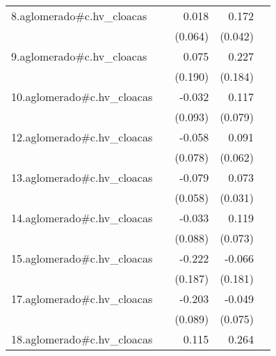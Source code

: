 {\begin{longtable}{l*{4}{D{.}{.}{-1}}}
\addlinespace
8.aglomerado#c.hv\_cloacas&                     &       0.018         &       0.172\sym{***}&                     \\
            &                     &     (0.064)         &     (0.042)         &                     \\
\addlinespace
9.aglomerado#c.hv\_cloacas&                     &       0.075         &       0.227         &                     \\
            &                     &     (0.190)         &     (0.184)         &                     \\
\addlinespace
10.aglomerado#c.hv\_cloacas&                     &      -0.032         &       0.117         &                     \\
            &                     &     (0.093)         &     (0.079)         &                     \\
\addlinespace
12.aglomerado#c.hv\_cloacas&                     &      -0.058         &       0.091         &                     \\
            &                     &     (0.078)         &     (0.062)         &                     \\
\addlinespace
13.aglomerado#c.hv\_cloacas&                     &      -0.079         &       0.073\sym{*}  &                     \\
            &                     &     (0.058)         &     (0.031)         &                     \\
\addlinespace
14.aglomerado#c.hv\_cloacas&                     &      -0.033         &       0.119         &                     \\
            &                     &     (0.088)         &     (0.073)         &                     \\
\addlinespace
15.aglomerado#c.hv\_cloacas&                     &      -0.222         &      -0.066         &                     \\
            &                     &     (0.187)         &     (0.181)         &                     \\
\addlinespace
17.aglomerado#c.hv\_cloacas&                     &      -0.203\sym{*}  &      -0.049         &                     \\
            &                     &     (0.089)         &     (0.075)         &                     \\
\addlinespace
18.aglomerado#c.hv\_cloacas&                     &       0.115         &       0.264\sym{***}&                     \\

\end{longtable}}
